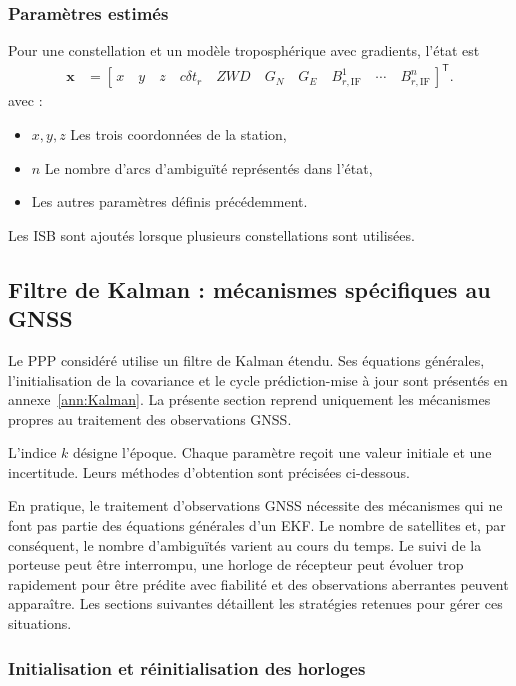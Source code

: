 \subsubsection{Paramètres estimés}

Pour une constellation et un modèle troposphérique avec gradients, l'état est
\begin{align}
\mathbf x&=[\,x \quad y \quad z \quad c\delta t_r\quad ZWD\quad
G_N\quad G_E\quad B_{r,\mathrm{IF}}^1\quad\cdots\quad
B_{r,\mathrm{IF}}^n\,]^{\mathsf T}.
\label{new:ppp_state}
\end{align}
avec :
\begin{itemize}
\item $x, y, z$ Les trois coordonnées de la station,
\item $n$ Le nombre d'arcs d'ambiguïté représentés dans l'état,
\item Les autres paramètres définis précédemment.
\end{itemize}
Les ISB sont ajoutés lorsque plusieurs constellations sont utilisées.

\subsection{Filtre de Kalman : mécanismes spécifiques au GNSS}
\label{ppp:kalman}

Le PPP considéré utilise un filtre de Kalman étendu. Ses équations générales,
l'initialisation de la covariance et le cycle prédiction-mise à jour sont
présentés en annexe~\ref{ann:Kalman}. La présente section reprend uniquement
les mécanismes propres au traitement des observations GNSS.

L'indice $k$ désigne l'époque. Chaque paramètre reçoit une valeur initiale
et une incertitude. Leurs méthodes d'obtention sont précisées ci-dessous.

\label{ppp:sec:ekf_gnss_features}

En pratique, le traitement d'observations GNSS nécessite des mécanismes qui ne
font pas partie des équations générales d'un EKF. Le nombre de satellites et,
par conséquent, le nombre d'ambiguïtés varient au cours du temps. Le suivi de
la porteuse peut être interrompu, une horloge de récepteur peut évoluer trop
rapidement pour être prédite avec fiabilité et des observations aberrantes
peuvent apparaître. Les sections suivantes détaillent les stratégies retenues pour gérer ces situations.

\subsubsection{Initialisation et réinitialisation des horloges}

